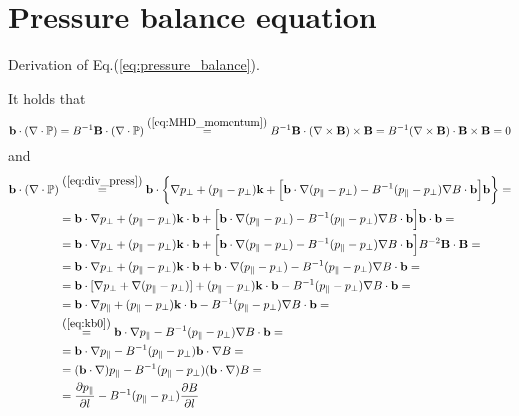 \section{Pressure balance equation}
Derivation of Eq.(\ref{eq:pressure_balance}).
\medskip

It holds that
\begin{equation*}
  \mathbf{b} \cdot(\nabla\cdot\mathbb{P})=B^{-1}\mathbf{B}\cdot(\nabla\cdot\mathbb{P})\overset{\mbox{(\ref{eq:MHD_momentum})}}{=} B^{-1}\mathbf{B}\cdot(\nabla\times\mathbf{B})\times\mathbf{B}=B^{-1}(\nabla\times\mathbf{B})\cdot\mathbf{B}\times\mathbf{B}=0
\end{equation*}
and
\begin{equation*}
  \begin{split}
    \mathbf{b} \cdot(\nabla\cdot\mathbb{P}) &\overset{\mbox{(\ref{eq:div_press})}}{=}
    \mathbf{b}\cdot\bigg\{\nabla p_\perp+(p_\parallel-p_\perp)\mathbf{k}+\Big[\mathbf{b}\cdot\nabla(p_\parallel-p_\perp)-B^{-1}(p_\parallel-p_\perp)\nabla B\cdot\mathbf{b}\Big]\mathbf{b}\bigg\}=\\
    &=\mathbf{b}\cdot\nabla p_\perp+(p_\parallel-p_\perp)\mathbf{k}\cdot\mathbf{b}+\Big[\mathbf{b}\cdot\nabla(p_\parallel-p_\perp)-B^{-1}(p_\parallel-p_\perp)\nabla B\cdot\mathbf{b}\Big]\mathbf{b}\cdot\mathbf{b}=\\
    &=\mathbf{b}\cdot\nabla p_\perp+(p_\parallel-p_\perp)\mathbf{k}\cdot\mathbf{b}+\Big[\mathbf{b}\cdot\nabla(p_\parallel-p_\perp)-B^{-1}(p_\parallel-p_\perp)\nabla B\cdot\mathbf{b}\Big]B^{-2}\mathbf{B}\cdot\mathbf{B}=\\
    &=\mathbf{b}\cdot\nabla p_\perp+(p_\parallel-p_\perp)\mathbf{k}\cdot\mathbf{b}+\mathbf{b}\cdot\nabla(p_\parallel-p_\perp)-B^{-1}(p_\parallel-p_\perp)\nabla B\cdot\mathbf{b}=\\
    &=\mathbf{b}\cdot[\nabla p_\perp+\nabla(p_\parallel-p_\perp)]+(p_\parallel-p_\perp)\mathbf{k}\cdot\mathbf{b}-B^{-1}(p_\parallel-p_\perp)\nabla B\cdot\mathbf{b}=\\
    &=\mathbf{b}\cdot\nabla p_\parallel+(p_\parallel-p_\perp)\mathbf{k}\cdot\mathbf{b}-B^{-1}(p_\parallel-p_\perp)\nabla B\cdot\mathbf{b}=\\
    &\overset{\mbox{(\ref{eq:kb0})}}{=}\mathbf{b}\cdot\nabla p_\parallel-B^{-1}(p_\parallel-p_\perp)\nabla B\cdot\mathbf{b}=\\
    &=\mathbf{b}\cdot\nabla p_\parallel-B^{-1}(p_\parallel-p_\perp)\mathbf{b}\cdot\nabla B=\\
    &=(\mathbf{b}\cdot\nabla) p_\parallel-B^{-1}(p_\parallel-p_\perp)(\mathbf{b}\cdot\nabla) B=\\
    &=\frac{\partial p_\parallel}{\partial l} -B^{-1}(p_\parallel-p_\perp)\frac{\partial B}{\partial l}
  \end{split}
\end{equation*}
